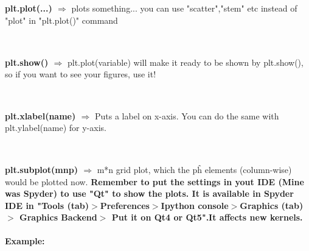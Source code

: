 \documentclass[a4paper,18pt]{article}
\begin{document}

\subsection{\colorbox {matgreen}{\color{white}{\large plt.plot(...)}}}
\textbf{plt.plot(...) $\Rightarrow$} plots something... you can use "scatter","stem" etc instead of "plot" in "plt.plot()" command\\\\


\subsection{\colorbox {matgreen}{\color{white}{\large plt.show()}}}
\textbf{plt.show() $\Rightarrow$} plt.plot(variable) will make it ready to be shown by plt.show(), so if you want to see your figures, use it!\\\\


\subsection{\colorbox {matgreen}{\color{white}{\large plt.xlabel(name)}}}
\textbf{plt.xlabel(name) $\Rightarrow$} Puts a label on x-axis. You can do the same with plt.ylabel(name) for y-axis.\\\\


\subsection{\colorbox {matgreen}{\color{white}{\large Subplots}}}
\textbf{plt.subplot(mnp) $\Rightarrow$} m*n grid plot, which the p\^{h} elements (column-wise) would be plotted now. \textbf{\textcolor{important}{Remember to put the settings in yout IDE (Mine was Spyder) to use "Qt" to show the plots. It is available in Spyder IDE in "Tools (tab)$>$Preferences$>$Ipython console$>$Graphics (tab)$>$ Graphics Backend$>$ Put it on Qt4 or Qt5".It affects new kernels.}}\\\\
\textbf{Example:\\}
\end{document}
